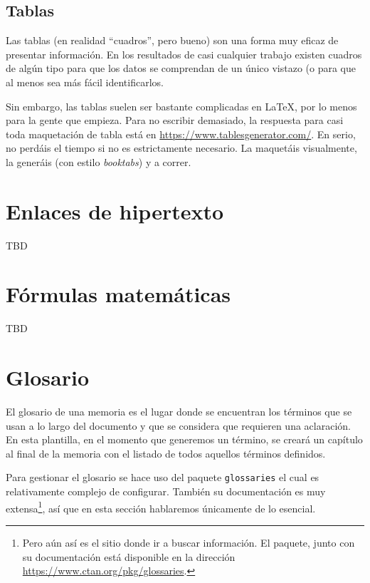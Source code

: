 \documentclass[%
    school=etsisi,%
    type=pfg,%
    degree=61CI,%
]{upm-report}
\begin{document}
\subsection{Tablas}

Las tablas (en realidad \enquote{cuadros}, pero bueno) son una forma muy eficaz de presentar información. En los resultados de casi cualquier trabajo existen cuadros de algún tipo para que los datos se comprendan de un único vistazo (o para que al menos sea más fácil identificarlos.

Sin embargo, las tablas suelen ser bastante complicadas en \LaTeX, por lo menos para la gente que empieza. Para no escribir demasiado, la respuesta para casi toda maquetación de tabla está en \href{https://www.tablesgenerator.com/}{https://www.tablesgenerator.com/}. En serio, no perdáis el tiempo si no es estrictamente necesario. La maquetáis visualmente, la generáis (con estilo \textit{booktabs}) y a correr.

\section{Enlaces de hipertexto}

TBD

\section{Fórmulas matemáticas}

TBD

\section{Glosario}
\label{s:glosario}

El glosario de una memoria es el lugar donde se encuentran los términos que se usan a lo largo del documento y que se considera que requieren una aclaración. En esta plantilla, en el momento que generemos un término, se creará un capítulo al final de la memoria con el listado de todos aquellos términos definidos.

Para gestionar el glosario se hace uso del paquete \texttt{glossaries} el cual es relativamente complejo de configurar. También su documentación es muy extensa\footnote{Pero aún así es el sitio donde ir a buscar información. El paquete, junto con su documentación está disponible en la dirección \href{https://www.ctan.org/pkg/glossaries}{https://www.ctan.org/pkg/glossaries}.}, así que en esta sección hablaremos únicamente de lo esencial.
\end{document}
